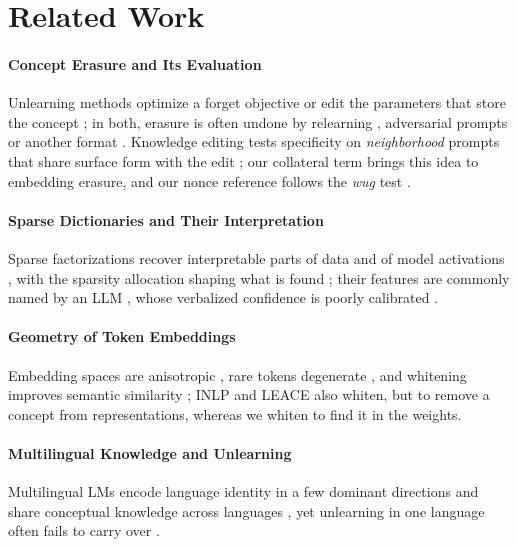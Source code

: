 \section{Related Work}
\label{sec:related}

\paragraph{Concept Erasure and Its Evaluation}
Unlearning methods optimize a forget objective \citep{eldan2023harry,li2024wmdp,ashuach2026crisp} or edit the parameters that store the concept \citep{gurarieh2025precise,shafran2026constructing,suslik2026ember}; in both, erasure is often undone by relearning \citep{deeb2024unlearning}, adversarial prompts \citep{lynch2024eight} or another format \citep{ye2025formindependent,hong2025intrinsic}.
Knowledge editing tests specificity on \emph{neighborhood} prompts that share surface form with the edit \citep{meng2022locating}; our collateral term brings this idea to embedding erasure, and our nonce reference follows the \emph{wug} test \citep{berko1958child}.

\paragraph{Sparse Dictionaries and Their Interpretation}
Sparse factorizations recover interpretable parts of data \citep{lee1999nmf,hoyer2004nmf} and of model activations \citep{bricken2023monosemanticity,huben2024sparse,gao2025scaling}, with the sparsity allocation shaping what is found \citep{makhzani2014ksparse,bussmann2024batchtopk}; their features are commonly named by an LLM \citep{bills2023language,paulo2024automatically}, whose verbalized confidence is poorly calibrated \citep{xiong2024can}.

\paragraph{Geometry of Token Embeddings}
Embedding spaces are anisotropic \citep{ethayarajh2019contextual,mu2018allbutthetop}, rare tokens degenerate \citep{gao2019representation}, and whitening improves semantic similarity \citep{su2021whitening}; INLP and LEACE \citep{ravfogel2020null,belrose2023leace} also whiten, but to remove a concept from representations, whereas we whiten to find it in the weights.

\paragraph{Multilingual Knowledge and Unlearning}
Multilingual LMs encode language identity in a few dominant directions \citep{chang2022geometry,libovicky2020language} and share conceptual knowledge across languages \citep{wendler2024llamas}, yet unlearning in one language often fails to carry over \citep{choi2024crosslingual,lu2025learn}.

